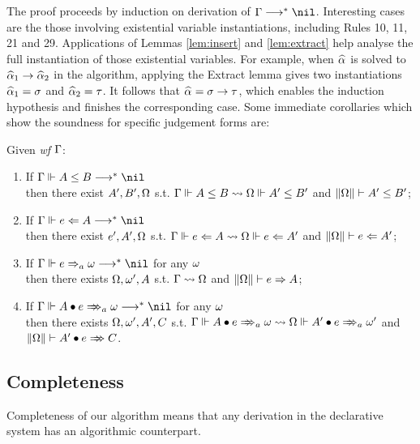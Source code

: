 The proof proceeds by induction on derivation of $\Gm\redto\nil$.
Interesting cases are the those involving existential variable instantiations,
including Rules 10, 11, 21 and 29.
Applications of Lemmas \ref{lem:insert} and \ref{lem:extract}
help analyse the full instantiation of those existential variables.
For example, when $\al$ is solved to $\al[1] \to \al[2]$ in the algorithm,
applying the Extract lemma gives two instantiations $\al[1] = \sigma$ and $\al[2] = \tau$.
It follows that $\al = \sigma \to \tau$, which enables the induction hypothesis
and finishes the corresponding case. Some immediate corollaries which
show the soundness for specific judgement forms are: 


\begin{corollary}
Given \emph{wf }$\Gamma$:
\begin{enumerate}
    \item If $\Gm \Vdash A \le B \redto \nil$\\
        then there exist $A', B', \Omega$ s.t.
        $\Gamma \Vdash A \le B \rightsquigarrow \Omega \Vdash A' \le B'$ and $\|\Omega\| \vdash A' \le B'$;
    \item If $\Gm \Vdash e \Lto A \redto \nil$\\
        then there exist $e', A', \Omega$ s.t.
        $\Gamma \Vdash e \Leftarrow A \rightsquigarrow \Omega \Vdash e \Leftarrow A'$ and $\|\Omega\| \vdash e \Leftarrow A'$;
    \item If $\Gm \Vdash e \To_a \jg \redto \nil$ for any $\omega$\\
        then there exists $\Omega, \omega', A$ s.t.
        $\Gamma \rightsquigarrow \Omega$ and $\|\Omega\| \vdash e \Rightarrow A$;
    \item If $\Gm \Vdash \appInfAlg{A}{e} \redto \nil$ for any $\omega$\\
        then there exists $\Omega, \omega', A', C$ s.t.
        $\Gm \Vdash \appInfAlg{A}{e} \sto \Om \Vdash \appInfAlg{A'}{e}[a][\jg']$
            and $\|\Om\| \vdash \appInf{A'}{e}{C}$.
\end{enumerate}
\end{corollary}

\subsection{Completeness}

Completeness of our algorithm means that any derivation in the
declarative system has an algorithmic counterpart.

